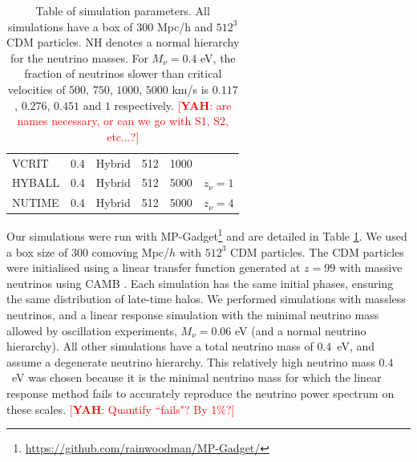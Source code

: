 \documentclass[useAMS, usenatbib]{mnras}
\newcommand{\yah}[1]{{\textcolor{red}{[{\bf YAH}: #1]}}}
\begin{document}
\begin{table}
\begin{center}
\begin{tabular}{|l|c|c|c|c|l|}
VCRIT    &     0.4             &   Hybrid      & 512       & 1000 & \\
HYBALL    &     0.4             &   Hybrid      & 512       & 5000 & $z_\nu = 1$ \\
NUTIME    &     0.4             &   Hybrid      & 512       & 5000 & $z_\nu = 4$  \\
\hline
\end{tabular}
\end{center}
\caption{Table of simulation parameters. All simulations have a box of $300$ Mpc/h
and $512^3$ CDM particles. NH denotes a normal hierarchy for the neutrino masses.
For $M_\nu = 0.4$ eV, the fraction of neutrinos slower than critical velocities of $500$, $750$, $1000$, $5000$ km/s is $0.117$, $0.276$, $0.451$ and $1$ respectively. \yah{are names necessary, or can we go with S1, S2, etc...?}}
\label{tab:simulations}
\end{table}


%

Our simulations were run with MP-Gadget\footnote{\url{https://github.com/rainwoodman/MP-Gadget/}} and are detailed in Table \ref{tab:simulations}. We used a box size of $300$ comoving Mpc/$h$ with $512^3$ CDM particles.
The CDM particles were initialised using a linear transfer function generated at $z=99$ with massive neutrinos using CAMB \citep{CAMB_neutrinos}. Each simulation has the same initial phases, ensuring the same distribution of late-time halos. We performed simulations with massless neutrinos, and a linear response simulation with the minimal neutrino mass allowed by oscillation experiments, $M_\nu = 0.06$ eV (and a normal neutrino hierarchy). All other simulations have a total neutrino mass of $0.4$~eV, and assume a degenerate neutrino hierarchy. This relatively high neutrino mass $0.4$~eV was chosen because it is the minimal neutrino mass for which the linear response method fails to accurately reproduce the neutrino power spectrum on these scales. \yah{Quantify ``fails"? By 1\%?}
\end{document}
